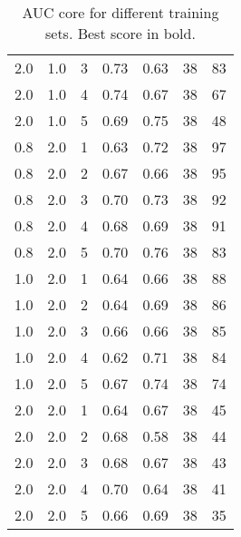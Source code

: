 \documentclass{report}
\begin{document}
\begin{table}[!h]
\begin{tabular}{C{1.5cm}  C{1.5cm}  c | C{2cm}  C{2cm} |  c  c}
  		2.0 & 1.0 & 3 & 0.73 & 0.63 & 38 & 83\\
  		2.0 & 1.0 & 4 & 0.74 & 0.67 & 38 & 67\\
  		2.0 & 1.0 & 5 & 0.69 & 0.75 & 38 & 48\\
  		0.8 & 2.0 & 1 & 0.63 & 0.72 & 38 & 97\\
  		0.8 & 2.0 & 2 & 0.67 & 0.66 & 38 & 95\\
  		0.8 & 2.0 & 3 & 0.70 & 0.73 & 38 & 92\\
  		0.8 & 2.0 & 4 & 0.68 & 0.69 & 38 & 91\\
  		0.8 & 2.0 & 5 & 0.70 & 0.76 & 38 & 83\\
  		1.0 & 2.0 & 1 & 0.64 & 0.66 & 38 & 88\\
  		1.0 & 2.0 & 2 & 0.64 & 0.69 & 38 & 86\\
  		1.0 & 2.0 & 3 & 0.66 & 0.66 & 38 & 85\\
  		1.0 & 2.0 & 4 & 0.62 & 0.71 & 38 & 84\\
  		1.0 & 2.0 & 5 & 0.67 & 0.74 & 38 & 74\\
  		2.0 & 2.0 & 1 & 0.64 & 0.67 & 38 & 45\\
  		2.0 & 2.0 & 2 & 0.68 & 0.58 & 38 & 44\\
  		2.0 & 2.0 & 3 & 0.68 & 0.67 & 38 & 43\\
  		2.0 & 2.0 & 4 & 0.70 & 0.64 & 38 & 41\\
  		2.0 & 2.0 & 5 & 0.66 & 0.69 & 38 & 35\\
  	\end{tabular}
  	\caption{AUC core for different training sets. Best score in bold.}
  	\label{table:exp_res}
  \end{table}
\end{document}
